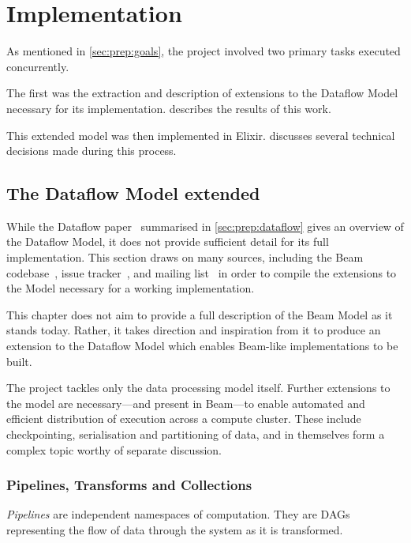 \chapter{Implementation}\label{ch:impl}

As mentioned in \cref{sec:prep:goals}, the project involved two primary tasks executed concurrently.

The first was the extraction and description of extensions to the Dataflow Model necessary for its implementation.
 describes the results of this work.

This extended model was then implemented in Elixir.
 discusses several technical decisions made during this process.

\section{The Dataflow Model extended}\label{sec:impl:dataflow}

While the Dataflow paper~\cite{Akidau:2015} summarised in \cref{sec:prep:dataflow} gives an overview of the Dataflow Model, it does not provide sufficient detail for its full implementation.
This section draws on many sources, including the Beam codebase~\cite{Beam-code}, issue tracker~\cite{Beam-JIRA}, and mailing list~\cite{Beam-mailing} in order to compile the extensions to the Model necessary for a working implementation.

This chapter does not aim to provide a full description of the Beam Model as it stands today.
Rather, it takes direction and inspiration from it to produce an extension to the Dataflow Model which enables Beam-like implementations to be built.

The project tackles only the data processing model itself.
Further extensions to the model are necessary---and present in Beam---to enable automated and efficient distribution of execution across a compute cluster.
These include checkpointing, serialisation and partitioning of data, and in themselves form a complex topic worthy of separate discussion.

\subsection{Pipelines, Transforms and Collections}\label{sec:impl:dataflow:pipelines-transforms-collections}

\emph{Pipelines} are independent namespaces of computation.
They are DAGs representing the flow of data through the system as it is transformed.

